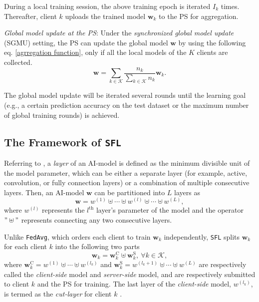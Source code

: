\documentclass[10pt,journal,transmag]{IEEEtran}
\begin{document}
During a local training session, the above training epoch is iterated $I_k$ times. Thereafter, client $k$ uploads the trained model $\textbf{w}_k$ to the PS for aggregation.

\textit{Global model update at the PS}: Under the \textit{synchronized global model update} (SGMU) setting, the PS can update the global model $\textbf{w}$ by using the following eq. \eqref{agrregation function}, only if all the local models of the $K$ clients are collected. 
\begin{equation}
    \textbf{w} = \sum_{k\in\mathcal{K}}\frac{n_k}{\sum_{k\in\mathcal{K}}n_k}\textbf{w}_k. \label{agrregation function}
\end{equation}

The global model update will be iterated several rounds until the learning goal (e.g., a certain prediction accuracy on the test dataset or the maximum number of global training rounds) is achieved.

\subsection{The Framework of \texttt{SFL}}
Referring to \cite{9812907}, a \textit{layer} of an AI-model is defined as the minimum divisible unit of the model parameter, which can be either a separate layer (for example, active, convolution, or fully connection layers) or a combination of multiple consecutive layers.
Then, an AI-model $\textbf{w}$ can be partitioned into $L$ layers as
\begin{equation}
    \textbf{w}=w^{(1)} \uplus \cdots \uplus w^{(l)}\uplus \cdots \uplus w^{(L)},
\end{equation}
where $w^{(l)}$ represents the $l^\text{th}$ layer's parameter of the model and the operator $"\uplus"$ represents connecting any two consecutive layers.

Unlike \texttt{FedAvg}, which orders each client to train $\textbf{w}_k$ independently, \texttt{SFL} splits $\textbf{w}_k$ for each client $k$ into the following two parts
\begin{equation}
    \textbf{w}_k=\textbf{w}^\text{C}_k \uplus \textbf{w}^\text{S}_k,\  \forall k \in \mathcal{K},
    \label{model integrity}
\end{equation}
where $\textbf{w}^\text{C}_k = w^{(1)} \uplus \cdots \uplus w^{(l_k)}$ and $\textbf{w}^\text{S}_k = w^{(l_k+1)} \uplus \cdots \uplus w^{(L)}$ are respectively called the \textit{client-side} model and \textit{server-side} model, and are respectively submitted to client $k$ and the PS for training. The last layer of the \textit{client-side} model, $w^{(l_k)}$, is termed as the \textit{cut-layer} for client $k$ \cite{Wu2022SplitLO}.
\end{document}

